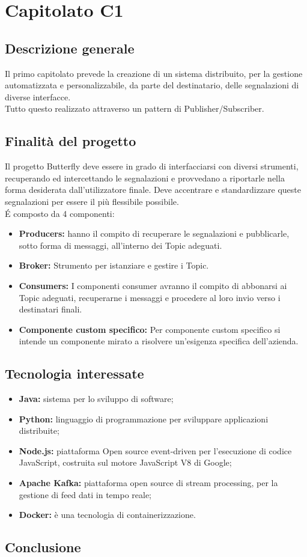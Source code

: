	\section{Capitolato C1}
	\subsection{Descrizione generale}
	Il primo capitolato prevede la creazione di un sistema distribuito, per la gestione automatizzata e personalizzabile, da parte del destinatario, delle segnalazioni di diverse interfacce.\\ 
	Tutto questo realizzato attraverso un pattern di Publisher/Subscriber.
	\subsection{Finalità del progetto}
	Il progetto Butterfly deve essere in grado di interfacciarsi con diversi strumenti, recuperando ed intercettando le segnalazioni e provvedano a riportarle nella forma desiderata dall'utilizzatore finale. Deve accentrare e standardizzare queste segnalazioni per essere il più flessibile possibile.\\
	\'E composto da 4 componenti:
	\begin{itemize}
		\item \textbf{Producers:} hanno il compito di recuperare le segnalazioni e pubblicarle, sotto forma di messaggi, all’interno dei Topic adeguati.
		\item \textbf{Broker:} Strumento per istanziare e gestire i Topic.
		\item \textbf{Consumers:} I componenti consumer avranno il compito di abbonarsi ai Topic adeguati, recuperarne i	messaggi e procedere al loro invio verso i destinatari finali.
		\item \textbf{Componente custom specifico:} Per componente custom specifico si intende un componente mirato a risolvere un’esigenza specifica dell’azienda. 
	\end{itemize}
	\subsection{Tecnologia interessate}
	\begin{itemize}
		\item \textbf{Java:} sistema per lo sviluppo di software;
		\item \textbf{Python:} linguaggio di programmazione per sviluppare applicazioni distribuite;
		\item \textbf{Node.js:} piattaforma Open source event-driven per l'esecuzione di codice JavaScript, costruita sul motore JavaScript V8 di Google;
		\item \textbf{Apache Kafka:} piattaforma open source di stream processing, per la gestione di feed dati in tempo reale;		
		\item \textbf{Docker:} è una tecnologia di containerizzazione.
	\end{itemize}
	\subsection{Conclusione}
	